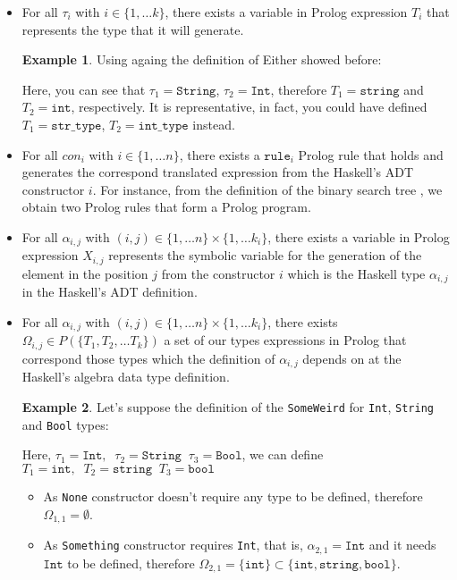 \documentclass{report}
\theoremstyle{definition}
\newtheorem{example}{Example}[section]
\theoremstyle{definition}
\newcommand{\ttt}[1]{\texttt{#1}}
\newcommand{\tav}{\;\;}
\begin{document}
\begin{itemize}
	\item For all $\tau_i$ with $i \in \{1, \ldots k \}$, there exists a variable in Prolog expression $T_i$ that represents the type that it will generate.
	\begin{example}
		Using againg the definition of Either showed before:
		
		Here, you can see that $\tau_1 = \ttt{String}$, $\tau_2 = \ttt{Int}$, therefore $T_1 = \ttt{string}$ and $T_2 = \ttt{int}$, respectively. It is representative, in fact, you could have defined $T_1 = \ttt{str\_type}$, $T_2 = \ttt{int\_type}$ instead.
	\end{example}
	\item For all $con_i$ with $i \in \{1, \ldots n \}$, there exists a $\ttt{rule}_i$ Prolog rule that holds and generates the correspond translated expression from the Haskell's ADT constructor $i$. For instance, from the definition of the binary search tree , we obtain two Prolog rules that form a Prolog program.
	\item For all $\alpha_{i,j}$ with $(i,j) \in \{1, \ldots n \} \times \{1, \ldots k_i \}$, there exists a variable in Prolog expression $X_{i,j}$ represents the symbolic variable for the generation of the element in the position $j$ from the constructor $i$ which is the Haskell type $\alpha_{i,j}$ in the Haskell's ADT definition.
	\item For all $\alpha_{i,j}$ with $(i,j) \in \{1, \ldots n \} \times \{1, \ldots k_i \}$, there exists $\Omega_{i,j} \in P(\{ T_1 , T_2, \ldots T_k \}) $ a set of our types expressions in Prolog that correspond those types which the definition of $\alpha_{i,j}$ depends on at the Haskell's algebra data type definition.
	\begin{example}
		Let's suppose the definition of the \ttt{SomeWeird} for \ttt{Int}, \ttt{String} and \ttt{Bool} types:
		
		Here, $\tau_1 = \ttt{Int}, \tav \tau_2=\ttt{String} \tav \tau_3=\ttt{Bool}$, we can define $T_1 = \ttt{int}, \tav T_2=\ttt{string} \tav T_3=\ttt{bool}$
		\begin{itemize}
			\item As \ttt{None} constructor doesn't require any type to be defined, therefore $\Omega_{1,1} = \emptyset$.
			\item As \ttt{Something} constructor requires \ttt{Int}, that is, $\alpha_{2,1} = \ttt{Int}$ and it needs $\ttt{Int}$ to be defined, therefore $\Omega_{2,1} = \{\ttt{int}\} \subset \{ \ttt{int}, \ttt{string}, \ttt{bool} \}$.

\end{itemize}
\end{example}
\end{itemize}
\end{document}
